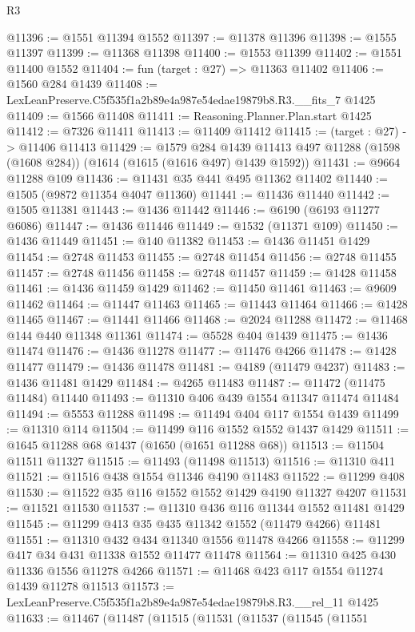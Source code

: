 \begin{lexlean}{R3}
\begin{coremodule}
@11396 := @1551 @11394 @1552
@11397 := @11378 @11396
@11398 := @1555 @11397
@11399 := @11368 @11398
@11400 := @1553 @11399
@11402 := @1551 @11400 @1552
@11404 := fun (target : @27) => @11363 @11402
@11406 := @1560 @284 @1439
@11408 := LexLeanPreserve.C5f535f1a2b89e4a987e54edae19879b8.R3.__fits_7 @1425
@11409 := @1566 @11408
@11411 := Reasoning.Planner.Plan.start @1425
@11412 := @7326 @11411
@11413 := @11409 @11412
@11415 := (target : @27) -> @11406 @11413
@11429 := @1579
    @284
    @1439
    @11413
    @497
    @11288
    (@1598 (@1608 @284))
    (@1614 (@1615 (@1616 @497) @1439 @1592))
@11431 := @9664 @11288 @109
@11436 := @11431 @35 @441 @495 @11362 @11402
@11440 := @1505 (@9872 @11354 @4047 @11360)
@11441 := @11436 @11440
@11442 := @1505 @11381
@11443 := @1436 @11442
@11446 := @6190 (@6193 @11277 @6086)
@11447 := @1436 @11446
@11449 := @1532 (@11371 @109)
@11450 := @1436 @11449
@11451 := @140 @11382
@11453 := @1436 @11451 @1429
@11454 := @2748 @11453
@11455 := @2748 @11454
@11456 := @2748 @11455
@11457 := @2748 @11456
@11458 := @2748 @11457
@11459 := @1428 @11458
@11461 := @1436 @11459 @1429
@11462 := @11450 @11461
@11463 := @9609 @11462
@11464 := @11447 @11463
@11465 := @11443 @11464
@11466 := @1428 @11465
@11467 := @11441 @11466
@11468 := @2024 @11288
@11472 := @11468 @144 @440 @11348 @11361
@11474 := @5528 @404 @1439
@11475 := @1436 @11474
@11476 := @1436 @11278
@11477 := @11476 @4266
@11478 := @1428 @11477
@11479 := @1436 @11478
@11481 := @4189 (@11479 @4237)
@11483 := @1436 @11481 @1429
@11484 := @4265 @11483
@11487 := @11472 (@11475 @11484) @11440
@11493 := @11310 @406 @439 @1554 @11347 @11474 @11484
@11494 := @5553 @11288
@11498 := @11494 @404 @117 @1554 @1439
@11499 := @11310 @114
@11504 := @11499 @116 @1552 @1552 @1437 @1429
@11511 := @1645 @11288 @68 @1437 (@1650 (@1651 @11288 @68))
@11513 := @11504 @11511 @11327
@11515 := @11493 (@11498 @11513)
@11516 := @11310 @411
@11521 := @11516 @438 @1554 @11346 @4190 @11483
@11522 := @11299 @408
@11530 := @11522 @35 @116 @1552 @1552 @1429 @4190 @11327 @4207
@11531 := @11521 @11530
@11537 := @11310 @436 @116 @11344 @1552 @11481 @1429
@11545 := @11299 @413 @35 @435 @11342 @1552 (@11479 @4266) @11481
@11551 := @11310 @432 @434 @11340 @1556 @11478 @4266
@11558 := @11299 @417 @34 @431 @11338 @1552 @11477 @11478
@11564 := @11310 @425 @430 @11336 @1556 @11278 @4266
@11571 := @11468 @423 @117 @1554 @11274 @1439 @11278 @11513
@11573 := LexLeanPreserve.C5f535f1a2b89e4a987e54edae19879b8.R3.__rel_11 @1425
@11633 := @11467
    (@11487
      (@11515
        (@11531
          (@11537
            (@11545
              (@11551

\end{coremodule}
\end{lexlean}
